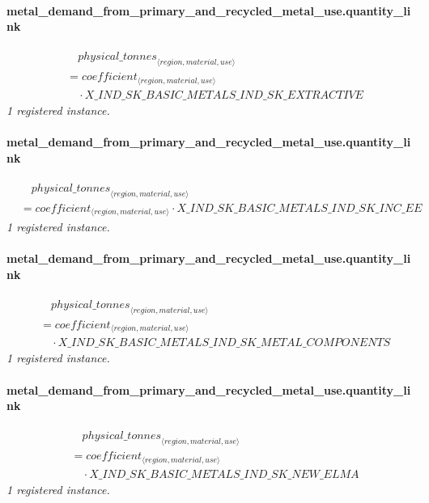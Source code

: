 \documentclass[11pt]{article}
\begin{document}
\paragraph{metal\_demand\_from\_primary\_and\_recycled\_metal\_use.quantity\_link}
\begin{align*}
&\quad {physical\_tonnes}_{\langle region, material, use\rangle}\\
&= coefficient_{\langle region, material, use\rangle}\\
&\quad {}\cdot X\_IND\_SK\_BASIC\_METALS\_IND\_SK\_EXTRACTIVE
\end{align*}
\noindent\emph{1 registered instance.}\par
\paragraph{metal\_demand\_from\_primary\_and\_recycled\_metal\_use.quantity\_link}
\begin{align*}
&\quad {physical\_tonnes}_{\langle region, material, use\rangle}\\
&= coefficient_{\langle region, material, use\rangle} \cdot X\_IND\_SK\_BASIC\_METALS\_IND\_SK\_INC\_EE
\end{align*}
\noindent\emph{1 registered instance.}\par
\paragraph{metal\_demand\_from\_primary\_and\_recycled\_metal\_use.quantity\_link}
\begin{align*}
&\quad {physical\_tonnes}_{\langle region, material, use\rangle}\\
&= coefficient_{\langle region, material, use\rangle}\\
&\quad {}\cdot X\_IND\_SK\_BASIC\_METALS\_IND\_SK\_METAL\_COMPONENTS
\end{align*}
\noindent\emph{1 registered instance.}\par
\paragraph{metal\_demand\_from\_primary\_and\_recycled\_metal\_use.quantity\_link}
\begin{align*}
&\quad {physical\_tonnes}_{\langle region, material, use\rangle}\\
&= coefficient_{\langle region, material, use\rangle}\\
&\quad {}\cdot X\_IND\_SK\_BASIC\_METALS\_IND\_SK\_NEW\_ELMA
\end{align*}
\noindent\emph{1 registered instance.}\par
\end{document}
